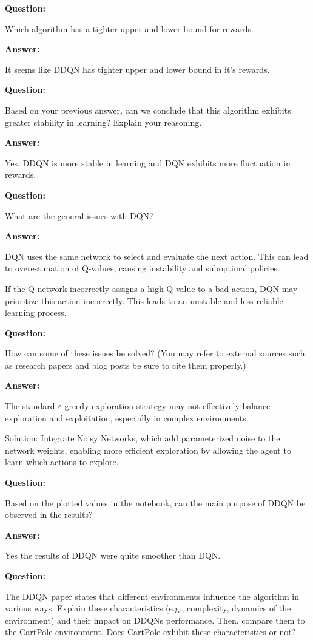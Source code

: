 \documentclass[12pt]{article}
\begin{document}
{{{{\textbf{Question:}

Which algorithm has a tighter upper and lower bound for rewards.

\textbf{Answer:}

It seems like DDQN has tighter upper and lower bound in it's rewards.

\textbf{Question:}

Based on your previous answer, can we conclude that this algorithm exhibits greater stability in learning? Explain your reasoning.

\textbf{Answer:}

Yes. DDQN is more stable in learning and DQN exhibits more fluctuation in rewards.

\textbf{Question:}

What are the general issues with DQN?

\textbf{Answer:}

DQN uses the same network to select and evaluate the next action. This can lead to overestimation of Q-values, causing instability and suboptimal policies.

If the Q-network incorrectly assigns a high Q-value to a bad action, DQN may prioritize this action incorrectly.
This leads to an unstable and less reliable learning process.

\textbf{Question:}

How can some of these issues be solved? (You may refer to external sources such as research papers
and blog posts be sure to cite them properly.)

\textbf{Answer:}

The standard $\varepsilon$-greedy exploration strategy may not effectively balance exploration and exploitation, especially in complex environments.

Solution: Integrate Noisy Networks, which add parameterized noise to the network weights, enabling more efficient exploration by allowing the agent to learn which actions to explore.

\textbf{Question:}

Based on the plotted values in the notebook, can the main purpose of DDQN be observed in the
results?

\textbf{Answer:}

Yes the results of DDQN were quite smoother than DQN.

\textbf{Question:}

The DDQN paper states that different environments influence the algorithm in various ways. Explain
these characteristics (e.g., complexity, dynamics of the environment) and their impact on DDQNs
performance. Then, compare them to the CartPole environment. Does CartPole exhibit these
characteristics or not?

}}}}
\end{document}
